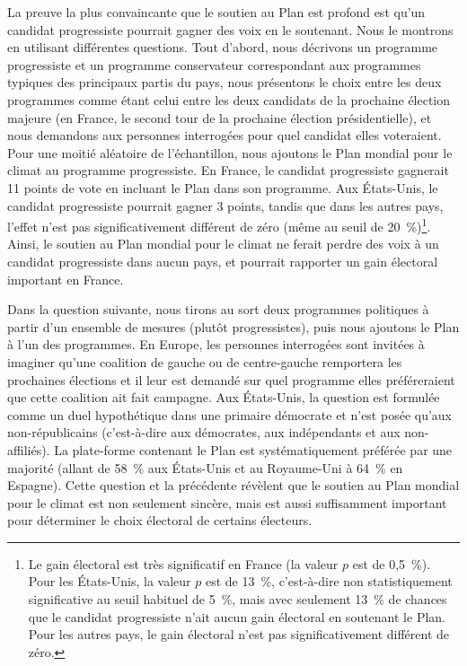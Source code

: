 \documentclass[a5paper,french]{memoir}
\begin{document}
La preuve la plus convaincante que le soutien au Plan est profond est qu'un candidat progressiste pourrait gagner des voix en le soutenant. Nous le montrons en utilisant différentes questions. Tout d'abord, nous décrivons un programme progressiste et un programme conservateur correspondant aux programmes typiques des principaux partis du pays, nous présentons le choix entre les deux programmes comme étant celui entre les deux candidats de la prochaine élection majeure (en France, le second tour de la prochaine élection présidentielle), et nous demandons aux personnes interrogées pour quel candidat elles voteraient. Pour une moitié aléatoire de l'échantillon, nous ajoutons le Plan mondial pour le climat au programme progressiste. En France, le candidat progressiste gagnerait 11 points de vote en incluant le Plan dans son programme. Aux États-Unis, le candidat progressiste pourrait gagner 3 points, tandis que dans les autres pays, l'effet n'est pas significativement différent de zéro (même au seuil de 20~\%)\footnote{Le gain électoral est très significatif en France (la valeur $p$ est de 0,5~\%). Pour les États-Unis, la valeur $p$ est de 13~\%, c'est-à-dire non statistiquement significative au seuil habituel de 5~\%, mais avec seulement 13~\% de chances que le candidat progressiste n'ait aucun gain électoral en soutenant le Plan. Pour les autres pays, le gain électoral n'est pas significativement différent de zéro.}. Ainsi, le soutien au Plan mondial pour le climat ne ferait perdre des voix à un candidat progressiste dans aucun pays, et pourrait rapporter un gain électoral important en France. 

Dans la question suivante, nous tirons au sort deux programmes politiques à partir d'un ensemble de mesures (plutôt progressistes), puis nous ajoutons le Plan à l'un des programmes. En Europe, les personnes interrogées sont invitées à imaginer qu'une coalition de gauche ou de centre-gauche remportera les prochaines élections et il leur est demandé sur quel programme elles préféreraient que cette coalition ait fait campagne. Aux États-Unis, la question est formulée comme un duel hypothétique dans une primaire démocrate et n'est posée qu'aux non-républicains (c'est-à-dire aux démocrates, aux indépendants et aux non-affiliés). La plate-forme contenant le Plan est systématiquement préférée par une majorité (allant de 58~\% aux États-Unis et au Royaume-Uni à 64~\% en Espagne). Cette question et la précédente révèlent que le soutien au Plan mondial pour le climat est non seulement sincère, mais est aussi suffisamment important pour déterminer le choix électoral de certains électeurs. 
\end{document}

